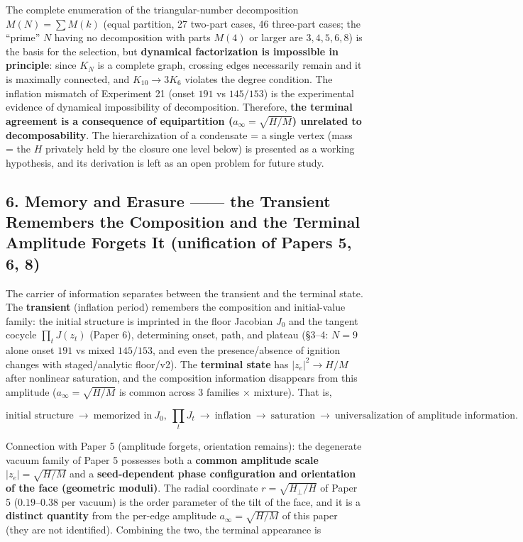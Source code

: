 \documentclass[
  a4paper,
]{ltjsarticle}
\begin{document}
The complete enumeration of the triangular-number decomposition
\(M(N)=\sum M(k)\) (equal partition, 27 two-part cases, 46 three-part
cases; the ``prime'' \(N\) having no decomposition with parts \(M(4)\)
or larger are \(3,4,5,6,8\)) is the basis for the selection, but
\textbf{dynamical factorization is impossible in principle}: since
\(K_N\) is a complete graph, crossing edges necessarily remain and it is
maximally connected, and \(K_{10}\to3K_6\) violates the degree
condition. The inflation mismatch of Experiment 21 (onset \(191\) vs
\(145/153\)) is the experimental evidence of dynamical impossibility of
decomposition. Therefore, \textbf{the terminal agreement is a
consequence of equipartition (\(a_\infty=\sqrt{H/M}\)) unrelated to
decomposability}. The hierarchization of a condensate = a single vertex
(mass = the \(H\) privately held by the closure one level below) is
presented as a working hypothesis, and its derivation is left as an open
problem for future study.

\subsection{6. Memory and Erasure ------ the Transient Remembers the
Composition and the Terminal Amplitude Forgets It (unification of Papers
5, 6,
8)}\label{memory-and-erasure-the-transient-remembers-the-composition-and-the-terminal-amplitude-forgets-it-unification-of-papers-5-6-8}

The carrier of information separates between the transient and the
terminal state. The \textbf{transient} (inflation period) remembers the
composition and initial-value family: the initial structure is imprinted
in the floor Jacobian \(J_0\) and the tangent cocycle \(\prod_t J(z_t)\)
(Paper 6), determining onset, path, and plateau (§3--4: \(N=9\) alone
onset \(191\) vs mixed \(145/153\), and even the presence/absence of
ignition changes with staged/analytic floor/v2). The \textbf{terminal
state} has \(|z_e|^2\to H/M\) after nonlinear saturation, and the
composition information disappears from this amplitude
(\(a_\infty=\sqrt{H/M}\) is common across 3 families × mixture). That
is,

\[\text{initial structure}\ \to\ \text{memorized in}\ J_0,\ \textstyle\prod_t J_t\ \to\ \text{inflation}\ \to\ \text{saturation}\ \to\ \text{universalization of amplitude information}.\]

Connection with Paper 5 (amplitude forgets, orientation remains): the
degenerate vacuum family of Paper 5 possesses both a \textbf{common
amplitude scale} \(|z_e|=\sqrt{H/M}\) and a \textbf{seed-dependent phase
configuration and orientation of the face (geometric moduli)}. The
radial coordinate \(r=\sqrt{H_\perp/H}\) of Paper 5 (\(0.19\)--\(0.38\)
per vacuum) is the order parameter of the tilt of the face, and it is a
\textbf{distinct quantity} from the per-edge amplitude
\(a_\infty=\sqrt{H/M}\) of this paper (they are not identified).
Combining the two, the terminal appearance is
\end{document}
